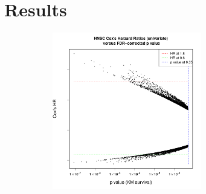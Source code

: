 \documentclass[
paper=landscape,
paper=160mm:90mm, %
fontsize=11pt, %
pagesize, %
parskip=half-, %
]{scrartcl} %
\theoremstyle{mythmstyle} %
\begin{document}
\section{Results}

\thispagestyle{myheadings}


\begin{figure}[ht]


    \begin{subfigure}[t]{0.45\textwidth}
        \includegraphics[width=6.5cm]{Rplot02_FDRP_uniHR.pdf}  %


\end{subfigure}
\end{figure}
\end{document}
